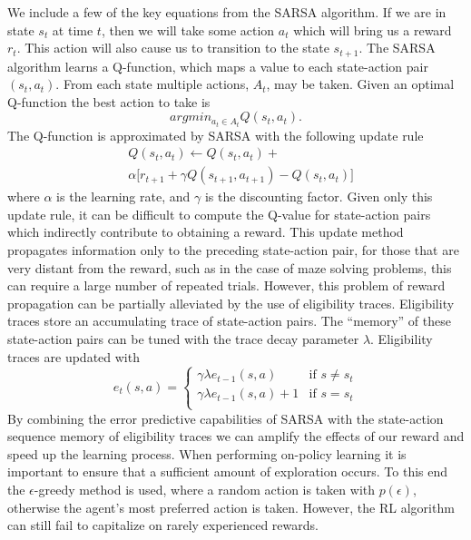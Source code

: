 We include a few of the key equations from the SARSA algorithm. If we are in state
$s_t$ at time $t$, then we will take some action $a_t$ which will bring us a
reward $r_t$. This action will also cause us to transition to the state
$s_{t+1}$. The SARSA algorithm learns a Q-function, which maps a value to each 
state-action pair $(s_t,a_t)$. From each state multiple actions, $A_t$, may be taken. Given an optimal Q-function the best action to take is
\begin{equation} argmin_{a_t \in A_t} Q(s_t,a_t).
\end{equation}
\noindent The Q-function is approximated by SARSA with the following update rule
\begin{eqnarray} 
& Q(s_t,a_t) \leftarrow Q(s_t,a_t)+ \nonumber \\ 
& \alpha \big[r_{t+1}+\gamma Q(s_{t+1},a_{t+1}) - Q(s_t,a_t)\big] 
\end{eqnarray}
\noindent where $\alpha$ is the learning rate, and $\gamma$ is the discounting
factor. Given only this update rule, it can be difficult to compute the Q-value
for state-action pairs which indirectly contribute to obtaining a reward. This
update method propagates information only to the preceding state-action pair,
for those that are very distant from the reward, such as in the case of maze
solving problems, this can require a large number of repeated trials. However,
this problem of reward propagation can be partially alleviated by the use of
eligibility traces. Eligibility traces store an accumulating trace of
state-action pairs. The ``memory'' of these state-action pairs can be tuned with
the trace decay parameter $\lambda$. Eligibility traces are updated with
\begin{equation}
e_t(s,a) = 	\begin{cases}
			\gamma \lambda e_{t-1}(s,a) & \mbox{if } s \neq s_t \\ 
			\gamma \lambda e_{t-1}(s,a)+1 & \mbox{if }s = s_t \\
			\end{cases}
\end{equation} 
\noindent By combining the error predictive capabilities of SARSA with the
state-action sequence memory of eligibility traces we can amplify the effects
of our reward and speed up the learning process. When performing on-policy
learning it is important to ensure that a sufficient amount of exploration
occurs. To this end the $\epsilon$-greedy method is used, where a random
action is taken with $p(\epsilon)$, otherwise the agent's most preferred 
action is taken. However, the RL algorithm can still fail to capitalize on rarely
experienced rewards. 